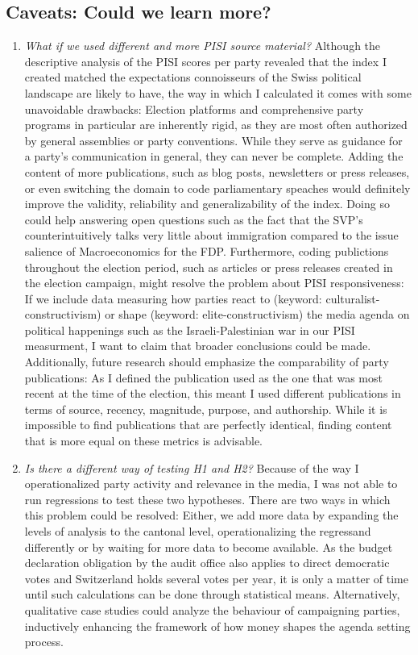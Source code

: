 \documentclass[11pt,a4paper]{article}
\begin{document}
\subsection{Caveats: Could we learn more?}
\begin{enumerate}
    \item \textit{What if we used different and more PISI source material?} Although the descriptive analysis of the PISI scores per party revealed that the index I created matched the expectations connoisseurs of the Swiss political landscape are likely to have, the way in which I calculated it comes with some unavoidable drawbacks: Election platforms and comprehensive party programs in particular are inherently rigid, as they are most often authorized by general assemblies or party conventions. While they serve as guidance for a party’s communication in general, they can never be complete. Adding the content of more publications, such as blog posts, newsletters or press releases, or even switching the domain to code parliamentary speaches would definitely improve the validity, reliability and generalizability of the index. Doing so could help answering open questions such as the fact that the SVP’s counterintuitively talks very little about immigration compared to the issue salience of Macroeconomics for the FDP. Furthermore, coding publictions throughout the election period, such as articles or press releases created in the election campaign, might resolve the problem about PISI responsiveness: If we include data measuring how parties react to (keyword: culturalist-constructivism) or shape (keyword: elite-constructivism) the media agenda on political happenings such as the Israeli-Palestinian war in our PISI measurment, I want to claim that broader conclusions could be made. Additionally, future research should emphasize the comparability of party publications: As I defined the publication used as the one that was most recent at the time of the election, this meant I used different publications in terms of source, recency, magnitude, purpose, and authorship. While it is impossible to find publications that are perfectly identical, finding content that is more equal on these metrics is advisable.

    \item  \textit{Is there a different way of testing H1 and H2?} Because of the way I operationalized party activity and relevance in the media, I was not able to run regressions to test these two hypotheses. There are two ways in which this problem could be resolved: Either, we add more data by expanding the levels of analysis to the cantonal level, operationalizing the regressand differently or by waiting for more data to become available. As the budget declaration obligation by the audit office also applies to direct democratic votes and Switzerland holds several votes per year, it is only a matter of time until such calculations can be done through statistical means. Alternatively, qualitative case studies could analyze the behaviour of campaigning parties, inductively enhancing the framework of how money shapes the agenda setting process.


\end{enumerate}
\end{document}
